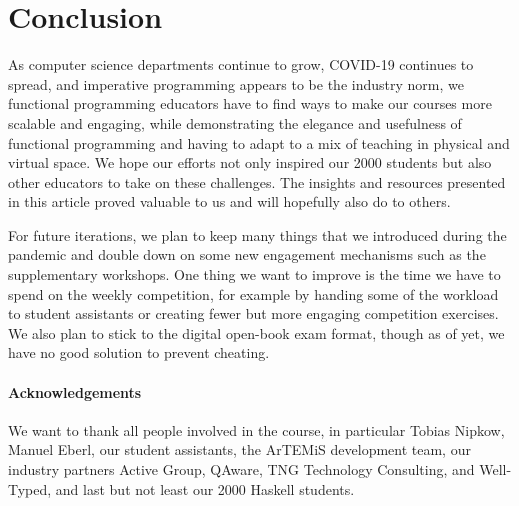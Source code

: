 \section{Conclusion}\label{sec:conclusion}

As computer science departments continue to grow,
COVID-19 continues to spread,
and imperative programming appears to be the industry norm,
we functional programming educators
have to find ways to make our courses more scalable and
engaging, while demonstrating the elegance and usefulness of functional programming and having to adapt to a mix of teaching in physical and virtual space.
We hope our efforts not only inspired our 2000 students
but also other educators to take on these challenges.
The insights and resources presented in this article proved valuable to us and will hopefully also do to others.

For future iterations,
we plan to keep many things that we introduced during the pandemic and double down on some new engagement mechanisms such as the supplementary workshops.
One thing we want to improve is the
time we have to spend on the weekly competition,
for example by handing some of the workload to student assistants or creating fewer but more engaging competition exercises.
We also plan to stick to the digital open-book exam format,
though as of yet, we have no good solution to prevent cheating.

\paragraph{Acknowledgements}
We want to thank all people involved in the course,
in particular Tobias Nipkow,
Manuel Eberl,
our student assistants,
the ArTEMiS development team,
our industry partners
Active Group,
QAware,
TNG Technology Consulting,
and Well-Typed,
and last but not least our 2000 Haskell students.

